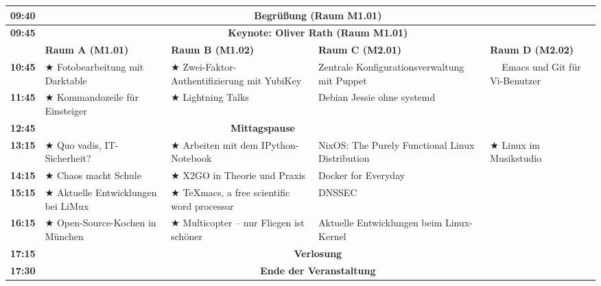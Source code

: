 \documentclass[10pt,a4paper,ngerman]{scrartcl}
\begin{document}
\begin{landscape}
\begin{center}\small\begin{tabular}{|c||l|l|l|l|}\hline
    \bfseries{09:40} & \multicolumn{4}{c|}{\rule[-3mm]{0mm}{8mm}{\bfseries{Begrüßung} (Raum M1.01)}}  \\ \hline
    \bfseries{09:45} &
    \multicolumn{4}{c|}{\rule[-3mm]{0mm}{8mm}{\bfseries Keynote: Oliver Rath (Raum M1.01)}}\\ \hline
      & \rule[-3mm]{0mm}{8mm}
        \bfseries{Raum A (M1.01)} &
        \bfseries{Raum B (M1.02)} &
        \bfseries{Raum C (M2.01)} &
        \bfseries{Raum D (M2.02)} \\ \hline \hline  
    \bfseries{10:45} & \rule[-3mm]{0mm}{8mm}
      $\bigstar$ Fotobearbeitung mit Darktable &
      $\bigstar$ Zwei-Faktor-Authentifizierung mit YubiKey &
      Zentrale Konfigurationsverwaltung mit Puppet &
      \multirow{3}{*}{$\phantom{\bigstar}$ Emacs und Git für Vi-Benutzer} \\
      \cline{1-4}
    \bfseries{11:45} & \rule[-3mm]{0mm}{8mm}
      $\bigstar$ Kommandozeile für Einsteiger &
      $\bigstar$ Lightning Talks &
      Debian Jessie ohne systemd &
      \\ \hline
    \bfseries{12:45} & \multicolumn{4}{c|}{\rule[-3mm]{0mm}{8mm}{\bfseries{Mittagspause}} }\\ \hline
    \bfseries{13:15} & \rule[-3mm]{0mm}{8mm}
      $\bigstar$ Quo vadis, IT-Sicherheit? &
      $\bigstar$ Arbeiten mit dem IPython-Notebook &
      NixOS: The Purely Functional Linux Distribution &
      \multirow{3}{*}{$\bigstar$ Linux im Musikstudio}
      \\ \cline{1-4}
    \bfseries{14:15} & \rule[-3mm]{0mm}{8mm}
      $\bigstar$ Chaos macht Schule &
      $\bigstar$ X2GO in Theorie und Praxis &
      Docker for Everyday & \\ \hline
    \bfseries{15:15} & \rule[-3mm]{0mm}{8mm}
      $\bigstar$ Aktuelle Entwicklungen bei LiMux &
      $\bigstar$ TeXmacs, a free scientific word processor &
      DNSSEC &
      $\bigstar$ Schicke Briefe mit LibreOffice
      \\ \hline 
    \bfseries{16:15} & \rule[-3mm]{0mm}{8mm}
      $\bigstar$ Open-Source-Kochen in München &
      $\bigstar$ Multicopter -- nur Fliegen ist schöner &
      Aktuelle Entwicklungen beim Linux-Kernel & \\ \hline
    \bfseries{17:15} & \multicolumn{4}{c|}{\rule[-3mm]{0mm}{8mm}{\bfseries{Verlosung}}} \\ \hline
    \bfseries{17:30} & \multicolumn{4}{c|}{\rule[-3mm]{0mm}{8mm}{\bfseries{Ende der Veranstaltung}}} \\ \hline
\end{tabular}\end{center}


\end{landscape}
\end{document}
